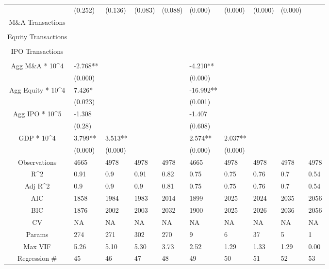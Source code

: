 \documentclass{article}
\begin{document}
\begin{table}[H]
\begin{tabular}{|clllllllll|}
   & (0.252) & (0.136) & (0.083) & (0.088) & (0.000) & (0.000) & (0.000) & (0.000) &  \\ 
  M\&A Transactions &  &  &  &  &  &  &  &  &  \\ 
   &  &  &  &  &  &  &  &  &  \\ 
  Equity Transactions &  &  &  &  &  &  &  &  &  \\ 
   &  &  &  &  &  &  &  &  &  \\ 
  IPO Transactions &  &  &  &  &  &  &  &  &  \\ 
   &  &  &  &  &  &  &  &  &  \\ 
  Agg M\&A * 10^4 & -2.768** &  &  &  & -4.210** &  &  &  &  \\ 
   & (0.000) &  &  &  & (0.000) &  &  &  &  \\ 
  Agg Equity * 10^4 & 7.426* &  &  &  & -16.992** &  &  &  &  \\ 
   & (0.023) &  &  &  & (0.001) &  &  &  &  \\ 
  Agg IPO * 10^5 & -1.308 &  &  &  & -1.407 &  &  &  &  \\ 
   & (0.28) &  &  &  & (0.608) &  &  &  &  \\ 
  GDP * 10^4 & 3.799** & 3.513** &  &  & 2.574** & 2.037** &  &  &  \\ 
   & (0.000) & (0.000) &  &  & (0.000) & (0.000) &  &  &  \\ 
  \hline 
 Observations & 4665 & 4978 & 4978 & 4978 & 4665 & 4978 & 4978 & 4978 & 4978 \\ 
  R^2 & 0.91 & 0.9 & 0.91 & 0.82 & 0.75 & 0.75 & 0.76 & 0.7 & 0.54 \\ 
  Adj R^2 & 0.9 & 0.9 & 0.9 & 0.81 & 0.75 & 0.75 & 0.76 & 0.7 & 0.54 \\ 
  AIC & 1858 & 1984 & 1983 & 2014 & 1899 & 2025 & 2024 & 2035 & 2056 \\ 
  BIC & 1876 & 2002 & 2003 & 2032 & 1900 & 2025 & 2026 & 2036 & 2056 \\ 
  CV & NA & NA & NA & NA & NA & NA & NA & NA & NA \\ 
  Params & 274 & 271 & 302 & 270 & 9 & 6 & 37 & 5 & 1 \\ 
  Max VIF & 5.26 & 5.10 & 5.30 & 3.73 & 2.52 & 1.29 & 1.33 & 1.29 & 0.00 \\ 
  Regression \# & 45 & 46 & 47 & 48 & 49 & 50 & 51 & 52 & 53 \\ 
   \hline
\end{tabular}
 
\end{table}
\end{document}
